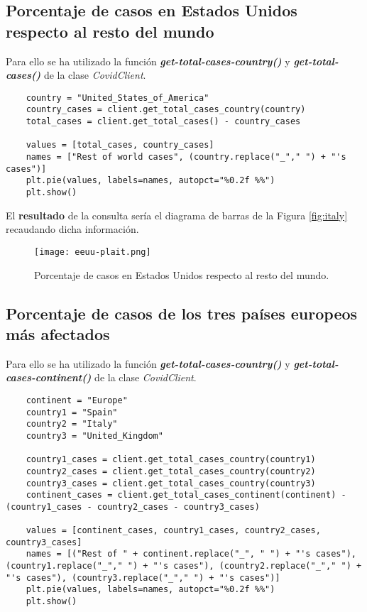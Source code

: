 \documentclass[11pt]{diazessay} %
\begin{document}
\subsection*{Porcentaje de casos en Estados Unidos respecto al resto del mundo}
Para ello se ha utilizado la función \textit{\textbf{get-total-cases-country()}} y \textit{\textbf{get-total-cases()}} \cite{jupyter} de la clase \textit{CovidClient}.

\lstset{language=Python}
\begin{lstlisting}
	country = "United_States_of_America"
	country_cases = client.get_total_cases_country(country)
	total_cases = client.get_total_cases() - country_cases
	
	values = [total_cases, country_cases]
	names = ["Rest of world cases", (country.replace("_"," ") + "'s cases")]
	plt.pie(values, labels=names, autopct="%0.2f %%")
	plt.show()
\end{lstlisting}

El \textbf{resultado} de la consulta sería el diagrama de barras de la Figura \ref{fig:italy} recaudando dicha información.

\begin{figure}[h!]
	\centering
	\texttt{[image: eeuu-plait.png]}
	\caption{Porcentaje de casos en Estados Unidos respecto al resto del mundo. \cite{matplotlib}}
	\label{fig:eeuu-plait}
\end{figure}



\subsection*{Porcentaje de casos de los tres países europeos más afectados}
Para ello se ha utilizado la función \textit{\textbf{get-total-cases-country()}} y \textit{\textbf{get-total-cases-continent()}} \cite{jupyter} de la clase \textit{CovidClient}.

\lstset{language=Python}
\begin{lstlisting}
	continent = "Europe"
	country1 = "Spain"
	country2 = "Italy"
	country3 = "United_Kingdom"
	
	country1_cases = client.get_total_cases_country(country1)
	country2_cases = client.get_total_cases_country(country2)
	country3_cases = client.get_total_cases_country(country3)
	continent_cases = client.get_total_cases_continent(continent) - (country1_cases - country2_cases - country3_cases)
	
	values = [continent_cases, country1_cases, country2_cases, country3_cases]
	names = [("Rest of " + continent.replace("_", " ") + "'s cases"), (country1.replace("_"," ") + "'s cases"), (country2.replace("_"," ") + "'s cases"), (country3.replace("_"," ") + "'s cases")]
	plt.pie(values, labels=names, autopct="%0.2f %%")
	plt.show()
\end{lstlisting}
\end{document}
